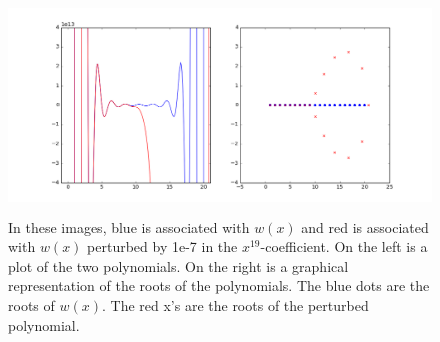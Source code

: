 \begin{figure}
\centering
\includegraphics[height=2.25in]{wilk2.png}
\caption{In these images, blue is associated with $w(x)$ and red is associated with $w(x)$ perturbed by 1e-7 in the $x^{19}$-coefficient. On the left is a plot of the two polynomials. On the right is a graphical representation of the roots of the polynomials. The blue dots are the roots of $w(x)$. The red x's are the roots of the perturbed polynomial. }
\label{fig:wilkinsonpolynomial}
\end{figure}


